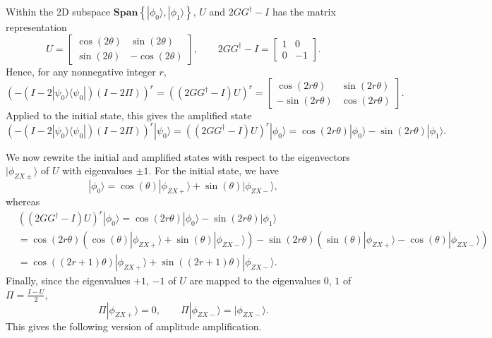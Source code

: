 \documentclass[letterpaper,onecolumn,11pt,accepted=2026-02-14]{quantumarticle}
\theoremstyle{remark}
\theoremstyle{plain}
\newcommand{\ket}[1]{|#1\rangle}
\newcommand{\bra}[1]{\langle#1|}
\newcommand{\ketbra}[2]{\ket{#1}\!\bra{#2}}
\begin{document}
Within the 2D subspace $\mathbf{Span}\left\{\ket{\phi_0},\ket{\phi_1}\right\}$, $U$ and $2GG^\dagger-I$ has the matrix representation
\begin{equation*}
    U=\begin{bmatrix}
        \cos(2\theta) & \sin(2\theta)\\
        \sin(2\theta) & -\cos(2\theta)
    \end{bmatrix},\qquad
    2GG^\dagger-I=\begin{bmatrix}
        1 & 0\\
        0 & -1
    \end{bmatrix}.
\end{equation*}
Hence, for any nonnegative integer $r$,
\begin{equation*}
    \left(-(I-2\ketbra{\psi_0}{\psi_0})(I-2\Pi)\right)^r
   =\left(\left(2GG^\dagger-I\right)U\right)^r=\begin{bmatrix}
        \cos(2r\theta) & \sin(2r\theta)\\
        -\sin(2r\theta) & \cos(2r\theta)
    \end{bmatrix}.
\end{equation*}
Applied to the initial state, this gives the amplified state
\begin{equation*}
    \left(-(I-2\ketbra{\psi_0}{\psi_0})(I-2\Pi)\right)^r\ket{\psi_0}
    =\left(\left(2GG^\dagger-I\right)U\right)^r\ket{\phi_0}
    =\cos(2r\theta)\ket{\phi_0}-\sin(2r\theta)\ket{\phi_1}.
\end{equation*}

We now rewrite the initial and amplified states with respect to the eigenvectors $\ket{\phi_{ZX\pm}}$ of $U$
with eigenvalues $\pm1$. For the initial state, we have
\begin{equation*}
    \ket{\phi_0}=\cos(\theta)\ket{\phi_{ZX+}}+\sin(\theta)\ket{\phi_{ZX-}},
\end{equation*}
whereas
\begin{equation*}
\begin{aligned}
    &\left(\left(2GG^\dagger-I\right)U\right)^r\ket{\phi_0}=\cos(2r\theta)\ket{\phi_0}-\sin(2r\theta)\ket{\phi_1}\\
    &=\cos(2r\theta)\left(\cos(\theta)\ket{\phi_{ZX+}}+\sin(\theta)\ket{\phi_{ZX-}}\right)
    -\sin(2r\theta)\left(\sin(\theta)\ket{\phi_{ZX+}}-\cos(\theta)\ket{\phi_{ZX-}}\right)\\
    &=\cos((2r+1)\theta)\ket{\phi_{ZX+}}+\sin((2r+1)\theta)\ket{\phi_{ZX-}}.
\end{aligned}
\end{equation*}
Finally, since the eigenvalues $+1$, $-1$ of $U$ are mapped to the eigenvalues $0$, $1$ of $\Pi=\frac{I-U}{2}$,
\begin{equation*}
    \Pi\ket{\phi_{ZX+}}=0,\qquad
    \Pi\ket{\phi_{ZX-}}=\ket{\phi_{ZX-}}.
\end{equation*}
This gives the following version of amplitude amplification.
\end{document}

